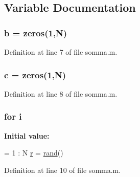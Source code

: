 \subsection{Variable Documentation}
\hypertarget{a00029_a21ad0bd836b90d08f4cf640b4c298e7c}{
\subsubsection[{b}]{\setlength{\rightskip}{0pt plus 5cm}b = zeros(1,N)}}\label{a00029_a21ad0bd836b90d08f4cf640b4c298e7c}


Definition at line 7 of file somma.\-m.

\hypertarget{a00029_ae0323a9039add2978bf5b49550572c7c}{
\subsubsection[{c}]{\setlength{\rightskip}{0pt plus 5cm}c = zeros(1,N)}}\label{a00029_ae0323a9039add2978bf5b49550572c7c}


Definition at line 8 of file somma.\-m.

\hypertarget{a00029_a6f6ccfcf58b31cb6412107d9d5281426}{
\subsubsection[{i}]{\setlength{\rightskip}{0pt plus 5cm}for i}}\label{a00029_a6f6ccfcf58b31cb6412107d9d5281426}
{\bfseries Initial value\-:}
\begin{DoxyCode}
= 1 : N
    \hyperlink{a00021_ac862e7284527eb913b1351c8bfb8e079}{r} = \hyperlink{a00064_a078f67f8fbdd9ac6587e03bdf2651d32}{rand}()
\end{DoxyCode}


Definition at line 10 of file somma.\-m.


